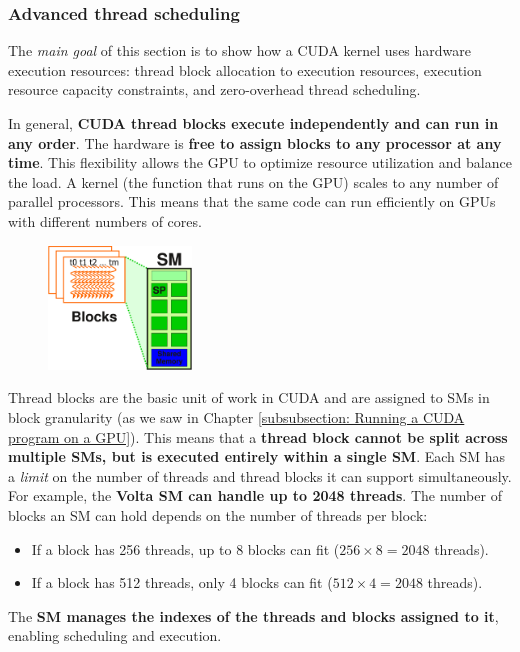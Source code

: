 \subsubsection{Advanced thread scheduling}

The \emph{main goal} of this section is to show how a CUDA kernel uses hardware execution resources: thread block allocation to execution resources, execution resource capacity constraints, and zero-overhead thread scheduling.

\highspace
In general, \textbf{CUDA thread blocks execute independently and can run in any order}. The hardware is \textbf{free to assign blocks to any processor at any time}. This flexibility allows the GPU to optimize resource utilization and balance the load. A kernel (the function that runs on the GPU) scales to any number of parallel processors. This means that the same code can run efficiently on GPUs with different numbers of cores.

\highspace
\begin{figure}
    \centering
    \includegraphics[width=0.34\textwidth]{img/executing-thread-blocks-1.pdf}
\end{figure}
Thread blocks are the basic unit of work in CUDA and are assigned to SMs in block granularity (as we saw in Chapter \ref{subsubsection: Running a CUDA program on a GPU}). This means that a \textbf{thread block cannot be split across multiple SMs, but is executed entirely within a single SM}. Each SM has a \emph{limit} on the number of threads and thread blocks it can support simultaneously. For example, the \textbf{Volta SM can handle up to 2048 threads}. The number of blocks an SM can hold depends on the number of threads per block:
\begin{itemize}
    \item If a block has 256 threads, up to 8 blocks can fit ($256 \times 8 = 2048$ threads).
    \item If a block has 512 threads, only 4 blocks can fit ($512 \times 4 = 2048$ threads).
\end{itemize}
The \textbf{SM manages the indexes of the threads and blocks assigned to it}, enabling scheduling and execution.

